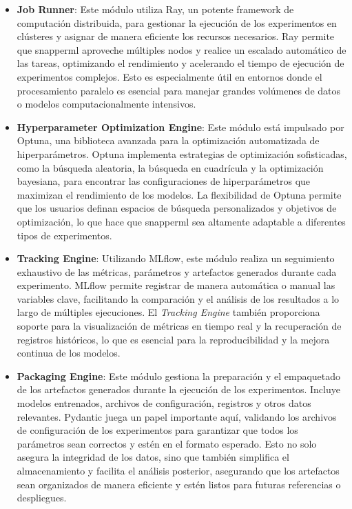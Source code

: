 \begin{itemize}
    \item \textbf{Job Runner}: Este módulo utiliza Ray, un potente \gls{framework} de computación distribuida, para gestionar la ejecución de los experimentos en clústeres y asignar de manera eficiente los recursos necesarios. Ray permite que \Gls{snapperml} aproveche múltiples nodos y realice un escalado automático de las tareas, optimizando el rendimiento y acelerando el tiempo de ejecución de experimentos complejos. Esto es especialmente útil en entornos donde el procesamiento paralelo es esencial para manejar grandes volúmenes de datos o modelos computacionalmente intensivos.
    \item \textbf{Hyperparameter Optimization Engine}: Este módulo está impulsado por Optuna, una biblioteca avanzada para la optimización automatizada de hiperparámetros. Optuna implementa estrategias de optimización sofisticadas, como la búsqueda aleatoria, la búsqueda en cuadrícula y la optimización bayesiana, para encontrar las configuraciones de hiperparámetros que maximizan el rendimiento de los modelos. La flexibilidad de Optuna permite que los usuarios definan espacios de búsqueda personalizados y objetivos de optimización, lo que hace que \Gls{snapperml} sea altamente adaptable a diferentes tipos de experimentos.

    \item \textbf{Tracking Engine}: Utilizando MLflow, este módulo realiza un seguimiento exhaustivo de las métricas, parámetros y \gls{artefactos} generados durante cada experimento. MLflow permite registrar de manera automática o manual las variables clave, facilitando la comparación y el análisis de los resultados a lo largo de múltiples ejecuciones. El \textit{Tracking Engine} también proporciona soporte para la visualización de métricas en tiempo real y la recuperación de registros históricos, lo que es esencial para la reproducibilidad y la mejora continua de los modelos.

    \item \textbf{Packaging Engine}: Este módulo gestiona la preparación y el empaquetado de los \gls{artefactos} generados durante la ejecución de los experimentos. Incluye modelos entrenados, archivos de configuración, registros y otros datos relevantes. Pydantic juega un papel importante aquí, validando los archivos de configuración de los experimentos para garantizar que todos los parámetros sean correctos y estén en el formato esperado. Esto no solo asegura la integridad de los datos, sino que también simplifica el almacenamiento y facilita el análisis posterior, asegurando que los \gls{artefactos} sean organizados de manera eficiente y estén listos para futuras referencias o despliegues.

\end{itemize}

